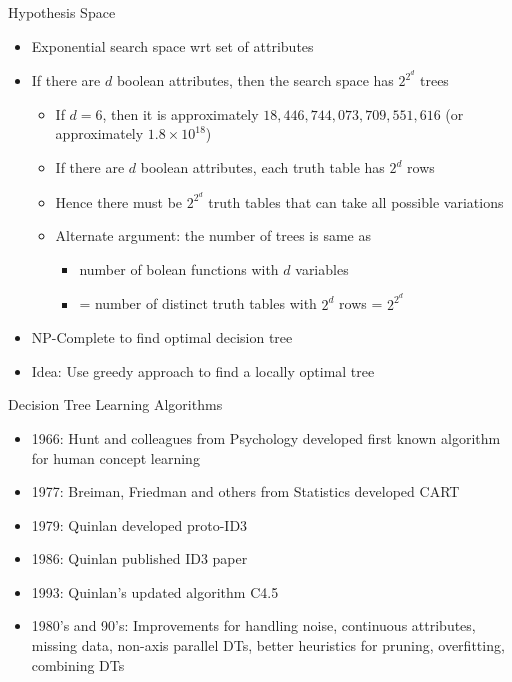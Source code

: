 \documentclass{beamer}
\begin{document}
\begin{frame}{Hypothesis Space}
    \begin{itemize}
        \item Exponential search space wrt set of attributes
        \item If there are $d$ boolean attributes, then the search space has $2^{2^d}$ trees
        \begin{itemize}
            \item If $d=6$, then it is approximately $18,446,744,073,709,551,616$ (or approximately $1.8 \times 10^{18}$)
            \item If there are $d$ boolean attributes, each truth table has $2^d$ rows
            \item Hence there must be $2^{2^d}$ truth tables that can take all possible variations 
            \item Alternate argument: the number of trees is same as 
            \begin{itemize}
                \item number of bolean functions with $d$ variables
                \item = number of distinct truth tables with $2^d$ rows = $2^{2^d}$
            \end{itemize}
        \end{itemize}
        \item NP-Complete to find optimal decision tree
        \item Idea: Use greedy approach to find a locally optimal tree
    \end{itemize}
\end{frame}

\begin{frame}{Decision Tree Learning Algorithms}
    \begin{itemize}
        \item 1966: Hunt and colleagues from Psychology developed first known algorithm for human concept learning
        \item 1977: Breiman, Friedman and others from Statistics developed CART
        \item 1979: Quinlan developed proto-ID3
        \item 1986: Quinlan published ID3 paper
        \item 1993: Quinlan's updated algorithm C4.5
        \item 1980's and 90's: Improvements for handling noise, continuous attributes, missing data, non-axis parallel DTs, better heuristics for pruning, overfitting, combining DTs
    \end{itemize}
\end{frame}
\end{document}
